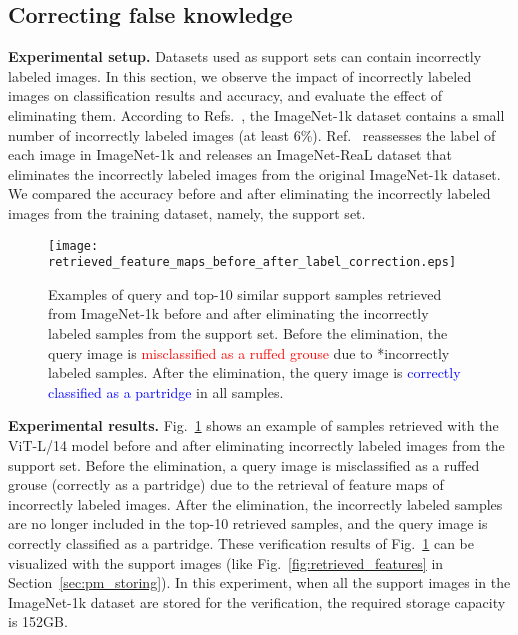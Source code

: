 \documentclass[runningheads]{llncs}
\begin{document}
\subsection{Correcting false knowledge}
\noindent
\textbf{Experimental setup.} Datasets used as support sets can contain incorrectly labeled images.
In this section, we observe the impact of incorrectly labeled images on classification results and accuracy, and evaluate the effect of eliminating them.
According to Refs.~\cite{ImageNetLabelError,ImageNetReaL}, the ImageNet-1k dataset contains a small number of incorrectly labeled images (at least 6\%).
Ref.~\cite{ImageNetReaL} reassesses the label of each image in ImageNet-1k and releases an ImageNet-ReaL dataset
that eliminates the incorrectly labeled images from the original ImageNet-1k dataset.
We compared the accuracy before and after eliminating the incorrectly labeled images from the training dataset, namely, the support set.\\

\begin{figure}[t]
   \begin{center}
   \texttt{[image: retrieved\_feature\_maps\_before\_after\_label\_correction.eps]}
   \end{center}
   \caption{Examples of query and top-10 similar support samples retrieved from ImageNet-1k before and after eliminating the incorrectly labeled samples from the support set.
   Before the elimination, the query image is \textcolor{red}{misclassified as a ruffed grouse} due to *incorrectly labeled samples.
   After the elimination, the query image is \textcolor{blue}{correctly classified as a partridge} in all samples.}
   \label{fig:retrieved_features_eliminate}
\end{figure}


\noindent
\textbf{Experimental results.}
Fig.~\ref{fig:retrieved_features_eliminate} shows an example of samples retrieved with the ViT-L/14 model before and after eliminating incorrectly labeled images from the support set.
Before the elimination, a query image is misclassified as a ruffed grouse (correctly as a partridge) due to the retrieval of feature maps of incorrectly labeled images.
After the elimination, the incorrectly labeled samples are no longer included in the top-10 retrieved samples, and the query image is correctly classified as a partridge.
These verification results of Fig.~\ref{fig:retrieved_features_eliminate} can be visualized with the support images (like Fig.~\ref{fig:retrieved_features} in Section~\ref{sec:pm_storing}).
In this experiment, when all the support images in the ImageNet-1k dataset are stored for the verification, the required storage capacity is 152GB.
\end{document}
